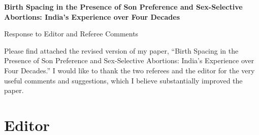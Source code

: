 \documentclass[letterpaper,12pt]{article}
\title{} \author{}
\begin{document}
\begin{center} \textbf{\large Birth Spacing in the Presence of Son
Preference and 
Sex-Selective Abortions: India's Experience over Four Decades}
\end{center}

\begin{center} Response to Editor and Referee Comments \end{center}

\noindent Please find attached the revised version of my paper,
``Birth Spacing in the Presence of Son Preference and Sex-Selective
Abortions:
India's Experience over Four Decades.''
I would like to thank the two referees and the editor for the very useful comments and 
suggestions, which I believe substantially improved the paper.

\section*{Editor}
\end{document}
